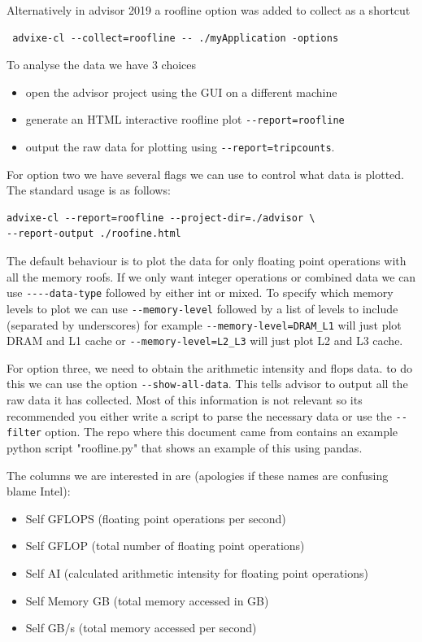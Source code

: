 \documentclass[a4paper, 11pt]{article}
\begin{document}
Alternatively in advisor 2019 a roofline option was added to collect as a shortcut
 \begin{verbatim}
 advixe-cl --collect=roofline -- ./myApplication -options
\end{verbatim}

To analyse the data we have 3 choices
\begin{itemize}
\item open the advisor project using the GUI on a different machine
\item generate an HTML interactive roofline plot \verb+--report=roofline+
\item output the raw data for plotting using \verb+--report=tripcounts+.
\end{itemize}

For option two we have several flags we can use to control what data is plotted. The standard usage is as follows:
\begin{verbatim}
advixe-cl --report=roofline --project-dir=./advisor \
--report-output ./roofine.html
\end{verbatim}

The default behaviour is to plot the data for only floating point operations with all the memory roofs. If we only want integer operations or combined data we can use \verb+----data-type+ followed by either int or mixed. To specify which memory levels to plot we can use \verb+--memory-level+ followed by a list of levels to include (separated by underscores) for example \verb+--memory-level=DRAM_L1+ will just plot DRAM and L1 cache or \verb+--memory-level=L2_L3+ will just plot L2 and L3 cache.
 

For option three, we need to obtain the arithmetic intensity and flops data. to do this we can use the option \verb+--show-all-data+. This tells advisor to output all the raw data it has collected. Most of this information is not relevant so its recommended you either write a script  to parse the necessary data or use the \verb+--filter+ option. The repo where this document came from contains an example python script "roofline.py" that shows an example of this using pandas.

The columns we are interested in are (apologies if these names are confusing blame Intel):
\begin{itemize}
\item Self GFLOPS (floating point operations per second)
\item Self GFLOP (total number of floating point operations) 
\item Self AI (calculated arithmetic intensity for floating point operations) 
\item Self Memory GB (total memory accessed in GB)
\item Self GB/s (total memory accessed per second)
\end{itemize}
\end{document}
